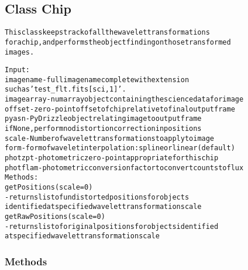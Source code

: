 

\subsection{Class Chip}

    \label{multireg:chipwavelets:Chip}
\begin{alltt}
This class keeps track of all the wavelet transformations
for a chip, and performs the object finding on those transformed
images.

Input:
    imagename   - full image name complete with extension
                    such as 'test\_flt.fits[sci,1]'.
    imagearray  - numarray object containing the science data for image
    offset      - zero-point offset of chip relative to final output frame
    pyasn       - PyDrizzle object relating image to output frame
                    if None, perform no distortion correction in positions
    scale       - Number of wavelet transformations to apply to image
    form        - form of wavelet interpolation: spline or linear (default)
    photzpt     - photometric zero-point appropriate for this chip
    photflam    - photometric conversion factor to convert counts to flux
Methods:
    getPositions(scale=0)       
        - returns list of undistorted positions for objects 
            identified at specified wavelet transformation scale
    getRawPositions(scale=0)    
        - returns list of original positions for objects identified
            at specified wavelet transformation scale\end{alltt}



  \subsubsection{Methods}

    \label{multireg:chipwavelets:Chip:__init__}
    \vspace{0.5ex}

